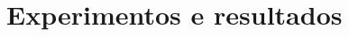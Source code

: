 \section{Experimentos e resultados} 
\begin{comment}
Dado que o sistema de planejamento é geral, foram feitos dois experimentos usando ambos algoritmos: para o mundo dos blocos (subseção~\ref{subsec:expblocos}) e para o mundo dos satélites (subseção~\ref{subsec:expsatelites}). Os dados de entrada são os proporcionados na página no curso (ver \cite{LabIA15}). Para todas as figuras, uma linha vermelha é para o algoritmo Blackbox e uma linha azul para o algoritmo SAT-Plan.

\subsection{Experimentos com mundo dos blocos}
\label{subsec:expblocos}
	A figura~\ref{fig:blockssize} mostra os tamanhos do plano de solução do sistema de planejamento para os problemas proporcionados (com 4 a 8 blocos) e mostra que enquanto o número de blocos aumenta, o tamanho do plano não muda muito. Além, para ambos algoritmos, o plano de solução é igual (por isso, só se ve a linha vermelha).
		\begin{figure}[H]
			\centering
			\texttt{[image: images/blocks\_size]}
			\caption{Tamanhos do plano de solução}
			\label{fig:blockssize}
		\end{figure}
	Mas na figura~\ref{fig:blockstime} se poder ver que os tempos de execução aumentam consideravelmente enquanto o número de blocos aumenta desde segundos até mais de uma hora para 8 blocos em caso de SAT-Plan. No caso de Blackbox os tempos são muito pequenos comparados com SAT-Plan para todos os casos.
		\begin{figure}[H]
			\centering
			\texttt{[image: images/blocks\_time]}
			\caption{Tempo de execução (segundos)}
			\label{fig:blockstime}
		\end{figure}
	Além disso, o número de proposições necessárias para solucionar o problema sempre aumenta apesar que o tamanho do plano não muda muito para ambos algoritmos. Mas para o algoritmo Blackbox (linha vermelha) não são necessárias muitas proposições, isto devido a que não coloca as cláusulas de fluentes, se não só de ações e isto adiciona menos proposições comparado com SAT-Plan.
		\begin{figure}[H]
			\centering
			\texttt{[image: images/blocks\_props]}
			\caption{Número de proposições}
			\label{fig:blocksprops}
		\end{figure}
	Por último, o número de cláusulas aumenta exponencialmente devido que se tem mais variáveis e portanto mais valores para evaluar as ações e fluentes, o que também adiciona mais axiomas em cada iteração dos algoritmos. Mas para o algoritmo Blackbox, o número de cláusulas é consideravelmente menor comparado com SAT-Plan pela mesma razão de número de proposições.
		\begin{figure}[H]
			\centering
			\texttt{[image: images/blocks\_clauses]}
			\caption{Número de cláusulas}
			\label{fig:blocksclauses}
		\end{figure}
		

\end{comment}
